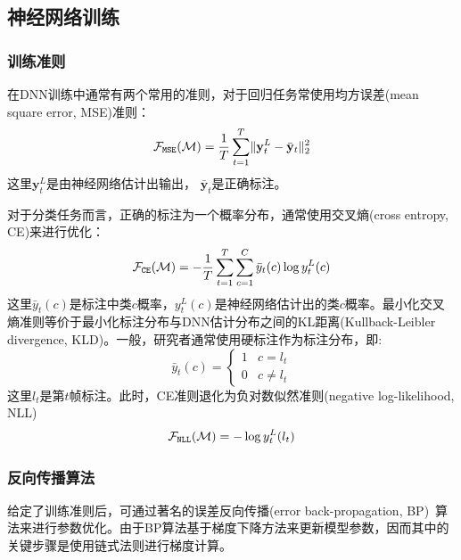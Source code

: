 \subsection{神经网络训练}
\subsubsection{训练准则}
在DNN训练中通常有两个常用的准则，对于回归任务常使用均方误差(mean square error, MSE)准则：
\begin{equation}
    \mathcal{F}_{\tt MSE}(\mathcal{M}) = \frac{1}{T}\sum_{t=1}^T \lVert \mathbf{y}_t^L - \bar{\mathbf{y}}_t \rVert^2_2
\end{equation}
这里$\mathbf{y}_t^L$是由神经网络估计出输出， $\bar{\mathbf{y}}_t$是正确标注。

对于分类任务而言，正确的标注为一个概率分布，通常使用交叉熵(cross entropy, CE)来进行优化：
\begin{equation}
    \mathcal{F}_{\tt CE}(\mathcal{M}) = - \frac{1}{T}\sum_{t=1}^T \sum_{c=1}^C \bar{y}_t(c) \log y_t^L(c)
\end{equation}
这里$\bar{y}_t(c)$是标注中类$c$概率，$y_t^L(c)$是神经网络估计出的类$c$概率。最小化交叉熵准则等价于最小化标注分布与DNN估计分布之间的KL距离(Kullback-Leibler divergence, KLD)。一般，研究者通常使用硬标注作为标注分布，即:
\begin{equation}
    \bar{y}_t(c) = 
    \begin{cases} 
        1& c=l_t \\ 
        0& c \ne l_t 
    \end{cases}
\end{equation}
这里$l_t$是第$t$帧标注。此时，CE准则退化为负对数似然准则(negative log-likelihood, NLL)
\begin{equation}
    \mathcal{F}_{\tt NLL}(\mathcal{M}) = -\log y^L_t(l_t)
\end{equation}

\subsubsection{反向传播算法}
给定了训练准则后，可通过著名的误差反向传播(error back-propagation, BP)~\cite{rumelhart1986learning}算法来进行参数优化。由于BP算法基于梯度下降方法来更新模型参数，因而其中的关键步骤是使用链式法则进行梯度计算。

